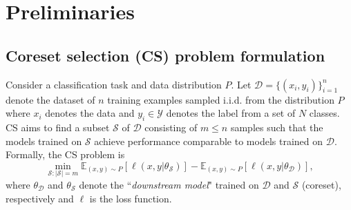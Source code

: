 \section{Preliminaries}
\label{sec:preliminaries}

\subsection{Coreset selection (CS) problem formulation}
\label{sec:preliminaries_cs}
Consider a classification task and data distribution $P$. 
Let $\mathcal{D} = \{(x_i, y_i)\}_{i=1}^{n}$ denote the dataset of $n$ training examples sampled i.i.d. from the distribution $P$ where $x_i$ denotes the data and $y_i \in \mathcal{Y}$ denotes the label from a set of $N$ classes.
CS \cite{coleman2019selection,zheng2022coverage} aims to find a subset $\mathcal{S}$ of $\mathcal{D}$ consisting of $m \leq n$ samples such that the models trained on $\mathcal{S}$ achieve performance comparable to models trained on $\mathcal{D}$. 
Formally, the CS problem is %
\begin{equation}
\label{eq:coreset_selection}
\min_{\mathcal{S}:|\mathcal{S}|=m} \mathbb{E}_{(x,y) \sim P}[\ell(x,y|\theta_{\mathcal{S}})] - \mathbb{E}_{(x,y) \sim P}[\ell(x,y|\theta_{\mathcal{D}})],
\end{equation}
where $\theta_{\mathcal{D}}$ and $\theta_{\mathcal{S}}$ denote the ``\emph{downstream model}"  trained on $\mathcal{D}$ and $\mathcal{S}$ (coreset), respectively and $\ell$ is the loss function.


